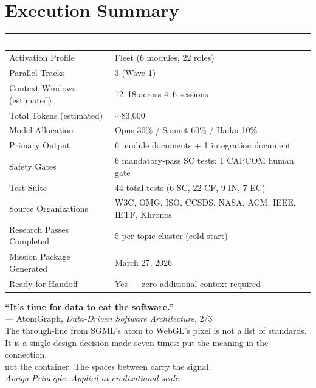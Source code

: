 \documentclass[11pt,letterpaper]{article}
\newcommand{\tableheader}[1]{\textbf{\sffamily\textcolor{white}{#1}}}
\begin{document}
\section{Execution Summary}

\begin{center}
\begin{tabularx}{\textwidth}{L{5cm}X}
\toprule
{}
\tableheader{Metric} & \tableheader{Value} \\
\midrule
Activation Profile & Fleet (6 modules, 22 roles) \\
Parallel Tracks & 3 (Wave 1) \\
Context Windows (estimated) & 12--18 across 4--6 sessions \\
Total Tokens (estimated) & $\sim$83,000 \\
Model Allocation & Opus 30\% / Sonnet 60\% / Haiku 10\% \\
Primary Output & 6 module documents + 1 integration document \\
Safety Gates & 6 mandatory-pass SC tests; 1 CAPCOM human gate \\
Test Suite & 44 total tests (6 SC, 22 CF, 9 IN, 7 EC) \\
Source Organizations & W3C, OMG, ISO, CCSDS, NASA, ACM, IEEE, IETF, Khronos \\
Research Passes Completed & 5 per topic cluster (cold-start) \\
Mission Package Generated & March 27, 2026 \\
Ready for Handoff & Yes --- zero additional context required \\
\bottomrule
\end{tabularx}
\end{center}

\vspace{1.5em}
\begin{quotebox}
\begin{center}
{\large\sffamily\bfseries\textcolor{primary}{``It's time for data to eat the software.''}}
\\[0.6em]
{\small\sffamily\textcolor{subtlegray}{--- AtomGraph, \textit{Data-Driven Software Architecture}, 2/3}}
\\[1.2em]
{\normalsize The through-line from SGML's atom to WebGL's pixel is not a list of standards.\\
It is a single design decision made seven times: put the meaning in the connection,\\
not the container. The spaces between carry the signal.\\[0.3em]
\textit{Amiga Principle. Applied at civilizational scale.}}
\end{center}
\end{quotebox}
\end{document}

